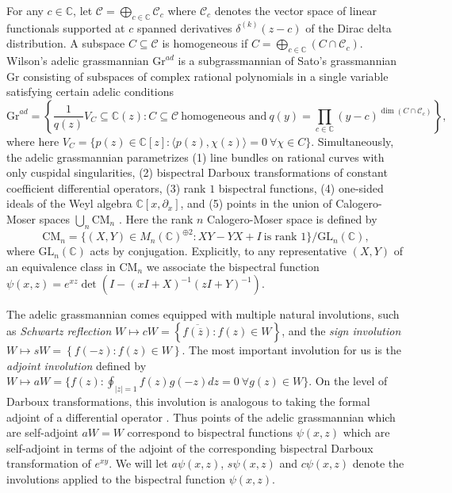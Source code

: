 \documentclass[11pt,letterpaper]{article}
\theoremstyle{definition}
\newcommand{\bbc}{\mathbb{C}}
\newcommand{\vocab}[1]{\emph{#1}}
\newcommand{\Gr}{\text{Gr}}
\newcommand{\ol}[1]{\overline{#1}}
\begin{document}
For any $c\in\bbc$, let $\mathscr C =\bigoplus_{c\in\bbc}\mathscr C_c$ where $\mathscr C_c$ denotes the vector space of linear functionals supported at $c$ spanned derivatives $\delta^{(k)}(z-c)$ of the Dirac delta distribution.
A subspace $C\subseteq\mathscr C$ is homogeneous if $C = \bigoplus_{c\in\bbc}(C\cap \mathscr C_c)$.
Wilson's adelic grassmannian $\Gr^{ad}$ is a subgrassmannian of Sato's grassmannian $\Gr$ consisting of subspaces of complex rational polynomials in a single variable satisfying certain adelic conditions
$$\Gr^{ad} = \left\lbrace\frac{1}{q(z)}V_C\subseteq \bbc(z): C\subseteq \mathscr C\ \text{homogeneous and}\ q(y) = \prod_{c\in\bbc} (y-c)^{\dim(C\cap \mathscr C_c)}\right\rbrace,$$
where here $V_C = \{p(z)\in\bbc[z]: \langle p(z),\chi(z)\rangle = 0\ \forall\chi\in C\}$.
Simultaneously, the adelic grassmannian parametrizes (1) line bundles on rational curves with only cuspidal singularities, (2) bispectral Darboux transformations of constant coefficient differential operators, (3) rank $1$ bispectral functions, (4) one-sided ideals of the Weyl algebra $\bbc[x,\partial_x]$, and (5) points in the union of Calogero-Moser spaces $\bigcup_n \text{CM}_n$ \cite{Wilson,Wilson98}.
Here the rank $n$ Calogero-Moser space is defined by
$$\text{CM}_n = \{(X,Y)\in M_n(\bbc)^{\oplus 2}: XY-YX+I\ \text{is rank $1$}\}/\text{GL}_n(\bbc),$$
where $\text{GL}_n(\bbc)$ acts by conjugation.
Explicitly, to any representative $(X,Y)$ of an equivalence class in $\text{CM}_n$ we associate the bispectral function $\psi(x,z) = e^{xz}\det(I-(xI+X)^{-1}(zI+Y)^{-1})$.

The adelic grassmannian comes equipped with multiple natural involutions, such as \vocab{Schwartz reflection} $W\mapsto cW = \left\lbrace\ol{f(\ol z)}: f(z)\in W\right\rbrace$, and the \vocab{sign involution} $W\mapsto sW = \left\lbrace f(-z): f(z)\in W\right\rbrace$.
The most important involution for us is the \vocab{adjoint involution} defined by $W\mapsto aW = \{f(z): \oint_{|z|=1} f(z)g(-z) dz = 0\ \forall g(z)\in W\}$.
On the level of Darboux transformations, this involution is analogous to taking the formal adjoint of a differential operator \cite{CY2019}.
Thus points of the adelic grassmannian which are self-adjoint $aW = W$ correspond to bispectral functions $\psi(x,z)$ which are self-adjoint in terms of the adjoint of the corresponding bispectral Darboux transformation of $e^{xy}$.
We will let $a\psi(x,z)$, $s\psi(x,z)$ and $c\psi(x,z)$ denote the involutions applied to the bispectral function $\psi(x,z)$.
\end{document}

